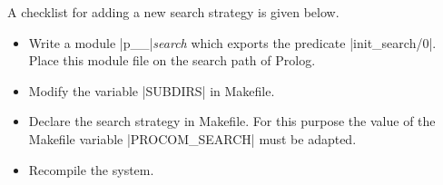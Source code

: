 A checklist for adding a new search strategy is given below.
\begin{itemize}
\item  Write   a   module  |p__|{\em search}     which exports  the  predicate
  |init_search/0|. Place  this  module file  on  the  search  path  of Prolog.

\item  Modify the variable |SUBDIRS| in {\sf Makefile}.

\item Declare the search strategy in {\sf Makefile}. For this purpose the
  value of the Makefile variable |PROCOM_SEARCH| must be adapted.

\item Recompile the system.
\end{itemize}

